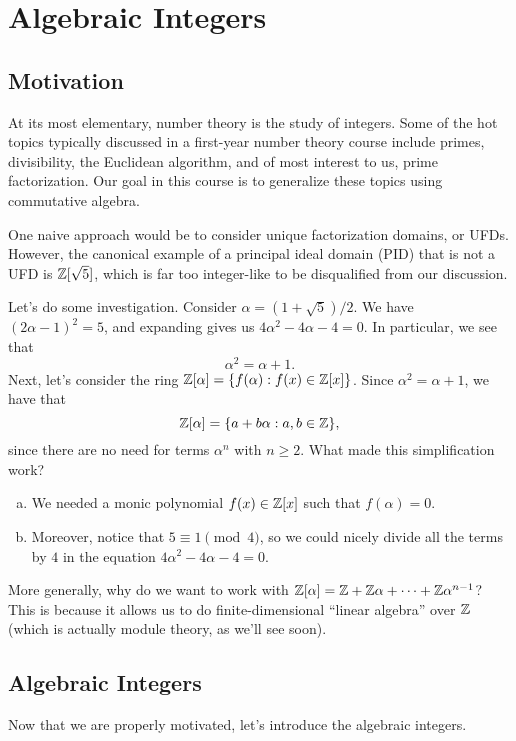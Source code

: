 \section{Algebraic Integers}\label{sec:1}

\subsection{Motivation}\label{subsec:1.1}
At its most elementary, number theory is the study of integers. Some of the 
hot topics typically discussed in a first-year number theory course 
include primes, divisibility, the Euclidean algorithm, and of most 
interest to us, prime factorization. Our goal in this course is to generalize 
these topics using commutative algebra. 

One naive approach would be to consider unique factorization domains, or 
UFDs. However, the canonical example of a principal ideal domain (PID) 
that is not a UFD is $\mathbb{Z}[\sqrt{5}]$, which is far too integer-like 
to be disqualified from our discussion. 

Let's do some investigation. Consider $\alpha = (1 + \sqrt{5})/2$. We have 
$(2\alpha - 1)^2 = 5$, and expanding gives us $4\alpha^2 - 4\alpha - 4 = 0$. 
In particular, we see that 
\[ \alpha^2 = \alpha + 1. \] 
Next, let's consider the ring $\mathbb{Z}[\alpha] = \{f(\alpha) : f(x) \in \mathbb{Z}[x]\}$. 
Since $\alpha^2 = \alpha + 1$, we have that
\[ \mathbb{Z}[\alpha] = \{a + b\alpha : a, b \in \mathbb{Z}\}, \] 
since there are no need for terms $\alpha^n$ with $n \geq 2$. What made 
this simplification work? 
\begin{enumerate}[(a)]
    \item We needed a monic polynomial $f(x) \in \mathbb{Z}[x]$ such that $f(\alpha) = 0$. 
    \item Moreover, notice that $5 \equiv 1 \pmod 4$, so we could nicely 
    divide all the terms by $4$ in the equation $4\alpha^2 - 4\alpha - 4 = 0$. 
\end{enumerate}
More generally, why do we want to work with $\mathbb{Z}[\alpha] = \mathbb{Z} + \mathbb{Z}\alpha 
+ \cdots + \mathbb{Z}\alpha^{n-1}$? This is because it allows us to do 
finite-dimensional ``linear algebra'' over $\mathbb{Z}$ (which is actually module 
theory, as we'll see soon).

\subsection{Algebraic Integers}\label{subsec:1.2}
Now that we are properly motivated, let's introduce the algebraic integers.


